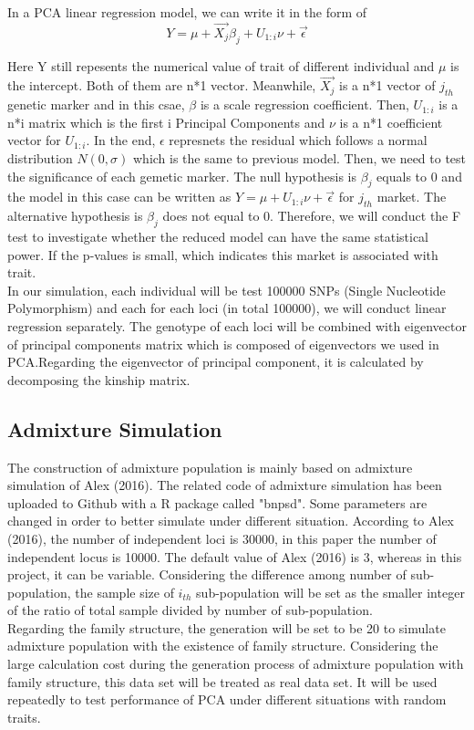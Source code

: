 \documentclass[12pt]{article}
\theoremstyle{definition}
\theoremstyle{plain}
\begin{document}
In a PCA linear regression model, we can write it in the form of $$Y=\mu+ \vec{X_{j}} {\beta}_{j}+U_{1:i} \nu+\vec{\epsilon}$$

Here Y still repesents the numerical value of trait of different individual and $\mu$ is the intercept. Both of them are n*1 vector. Meanwhile, $\vec{X_{j}}$ is a n*1 vector of $j_{th}$ genetic marker and in this csae, $\beta$ is a scale regression coefficient. Then, $U_{1:i}$ is a n*i matrix which is the first i Principal Components and $\nu$ is a n*1 coefficient vector for $U_{1:i}$. In the end, $\epsilon$ represnets the residual which follows a normal distribution $N(0,\sigma)$ which is the same to previous model. Then, we need to test the significance of each gemetic marker. The null hypothesis is ${\beta}_{j}$ equals to 0 and the model in this case can be written as $Y=\mu+U_{1:i} \nu+\vec{\epsilon}$ for $j_{th}$ market. The alternative hypothesis is ${\beta}_{j}$ does not equal to 0. Therefore, we will conduct the F test to investigate whether the reduced model can have the same statistical power. If the p-values is small, which indicates this market is associated with trait.\\

In our simulation, each individual will be test 100000 SNPs (Single Nucleotide Polymorphism) and each for each loci (in total 100000), we will conduct linear regression separately.  The genotype of each loci will be combined with eigenvector of principal components matrix which is composed of eigenvectors we used in PCA.Regarding the eigenvector of principal component, it is calculated by decomposing the kinship matrix.  

\subsection{Admixture Simulation}
The construction of admixture population is mainly based on admixture simulation of Alex (2016). The related code of admixture simulation has been uploaded to Github with a R package called "bnpsd".  Some parameters are changed in order to better simulate under different situation. According to Alex (2016), the number of independent loci is 30000, in this paper the number of independent locus is 10000. The default value of Alex (2016) is 3, whereas in this project, it can be variable. Considering the difference among number of sub-population, the sample size of $i_{th}$ sub-population will be set as the smaller integer of the ratio of total sample divided by number of sub-population.\\
Regarding the family structure, the generation will be set to be 20 to simulate admixture population with the existence of family structure. Considering the large calculation cost during the generation process of admixture population with family structure, this data set will be treated as real data set. It will be used repeatedly to test performance of PCA under different situations with random traits.
\end{document}
